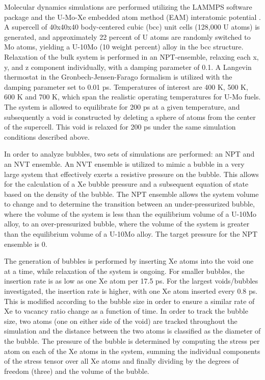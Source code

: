 \documentclass[review]{elsarticle}
\begin{document}
Molecular dynamics simulations are performed utilizing the LAMMPS \cite{plimpton1995} software package and the U-Mo-Xe embedded atom method (EAM) interatomic potential \cite{smirnovaUMo}. A supercell of 40x40x40 body-centered cubic (bcc) unit cells (128,000 U atoms) is generated, and approximately 22 percent of U atoms are randomly switched to Mo atoms, yielding a U-10Mo (10 weight percent) alloy in the bcc structure. Relaxation of the bulk system is performed in an NPT-ensemble, relaxing each x, y, and z component individually, with a damping parameter of 0.1. A Langevin thermostat in the Gronbech-Jensen-Farago \cite{gjf2013, gjf2014} formalism is utilized with the damping parameter set to 0.01 ps. Temperatures of interest are 400 K, 500 K, 600 K and 700 K, which span the realistic operating temperatures for U-Mo fuels. The system is allowed to equilibrate for 200 ps at a given temperature, and subsequently a void is constructed by deleting a sphere of atoms from the center of the supercell. This void is relaxed for 200 ps under the same simulation conditions described above. 

In order to analyze bubbles, two sets of simulations are performed: an NPT and an NVT ensemble. An NVT ensemble is utilized to mimic a bubble in a very large system that effectively exerts a resistive pressure on the bubble. This allows for the calculation of a Xe bubble pressure and a subsequent equation of state based on the density of the bubble. The NPT ensemble allows the system volume to change and to determine the transition between an under-pressurized bubble, where the volume of the system is less than the equilibrium volume of a U-10Mo alloy, to an over-pressurized bubble, where the volume of the system is greater than the equilibrium volume of a U-10Mo alloy. The target pressure for the NPT ensemble is 0. 

The generation of bubbles is performed by inserting Xe atoms into the void one at a time, while relaxation of the system is ongoing. For smaller bubbles, the insertion rate is as low as one Xe atom per 17.5 ps. For the largest voids/bubbles investigated, the insertion rate is higher, with one Xe atom inserted every 0.8 ps. This is modified according to the bubble size in order to ensure a similar rate of Xe to vacancy ratio change as a function of time. In order to track the bubble size, two atoms (one on either side of the void) are tracked throughout the simulation and the distance between the two atoms is classified as the diameter of the bubble. The pressure of the bubble is determined by computing the stress per atom on each of the Xe atoms in the system, summing the individual components of the stress tensor over all Xe atoms and finally dividing by the degrees of freedom (three) and the volume of the bubble. 
\end{document}
